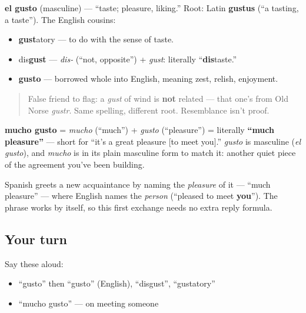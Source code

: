 \begin{cousinweb}
\textbf{el gusto} (masculine) — \textquotedblleft{}taste; pleasure, liking.\textquotedblright{} Root: Latin \textbf{gustus} (\textquotedblleft{}a tasting, a taste\textquotedblright{}). The English cousins:

\begin{itemize}
\raggedright
  \item \textbf{gust}atory — to do with the sense of taste.
  \item dis\textbf{gust} — \emph{dis-} (\textquotedblleft{}not, opposite\textquotedblright{}) + \emph{gust}: literally \textquotedblleft{}\textbf{dis}taste.\textquotedblright{}
  \item \textbf{gusto} — borrowed whole into English, meaning zest, relish, enjoyment.
\end{itemize}

\begin{quote}
False friend to flag: a \emph{gust} of wind is \textbf{not} related — that one's from Old Norse \emph{gustr}. Same spelling, different root. Resemblance isn't proof.
\end{quote}

\textbf{mucho gusto} = \emph{mucho} (\textquotedblleft{}much\textquotedblright{}) + \emph{gusto} (\textquotedblleft{}pleasure\textquotedblright{}) = literally \textbf{\textquotedblleft{}much pleasure\textquotedblright{}} — short for \textquotedblleft{}it's a great pleasure {[}to meet you{]}.\textquotedblright{} \emph{gusto} is masculine (\emph{el gusto}), and \emph{mucho} is in its plain masculine form to match it: another quiet piece of the agreement you've been building.
\end{cousinweb}

\begin{culture}
Spanish greets a new acquaintance by naming the \emph{pleasure} of it — \textquotedblleft{}much pleasure\textquotedblright{} — where English names the \emph{person} (\textquotedblleft{}pleased to meet \textbf{you}\textquotedblright{}). The phrase works by itself, so this first exchange needs no extra reply formula.
\end{culture}

\subsection*{Your turn}
Say these aloud:

\begin{itemize}
\raggedright
  \item \textquotedblleft{}gusto\textquotedblright{} then \textquotedblleft{}gusto\textquotedblright{} (English), \textquotedblleft{}disgust\textquotedblright{}, \textquotedblleft{}gustatory\textquotedblright{}
  \item \textquotedblleft{}mucho gusto\textquotedblright{} — on meeting someone
\end{itemize}

